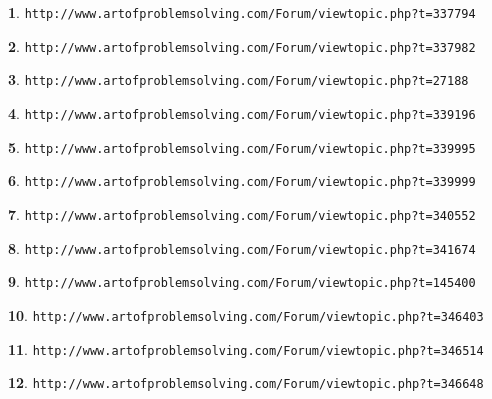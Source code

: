 \documentclass{article}
\theoremstyle{definition}
\newtheorem{s}{}
\begin{document}
\begin{s}
\texttt{http://www.artofproblemsolving.com/Forum/viewtopic.php?t=337794}
\end{s}


\begin{s}
\texttt{http://www.artofproblemsolving.com/Forum/viewtopic.php?t=337982}
\end{s}



\begin{s}
\texttt{http://www.artofproblemsolving.com/Forum/viewtopic.php?t=27188}
\end{s}


\begin{s}
\texttt{http://www.artofproblemsolving.com/Forum/viewtopic.php?t=339196}
\end{s}

\begin{s}
\texttt{http://www.artofproblemsolving.com/Forum/viewtopic.php?t=339995}
\end{s}


\begin{s}
\texttt{http://www.artofproblemsolving.com/Forum/viewtopic.php?t=339999}
\end{s}



\begin{s}
\texttt{http://www.artofproblemsolving.com/Forum/viewtopic.php?t=340552}
\end{s}


\begin{s}
\texttt{http://www.artofproblemsolving.com/Forum/viewtopic.php?t=341674}
\end{s}





\begin{s}
\texttt{http://www.artofproblemsolving.com/Forum/viewtopic.php?t=145400}
\end{s}


\begin{s}
\texttt{http://www.artofproblemsolving.com/Forum/viewtopic.php?t=346403}
\end{s}



\begin{s}
\texttt{http://www.artofproblemsolving.com/Forum/viewtopic.php?t=346514}
\end{s}


\begin{s}
\texttt{http://www.artofproblemsolving.com/Forum/viewtopic.php?t=346648}
\end{s}
\end{document}
